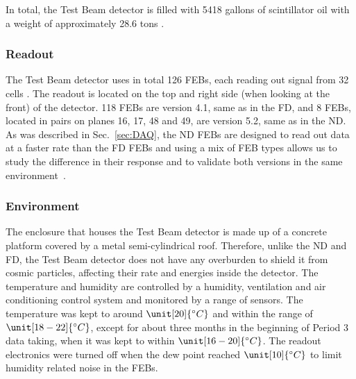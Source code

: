 
In total, the Test Beam detector is filled with 5418 gallons of scintillator oil with a weight of approximately 28.6 tons \cite{NOvA-doc-29543}.

\subsubsection*{Readout}
The Test Beam detector uses in total 126 \glspl{FEB}, each reading out signal from 32 cells \cite{NOvA-doc-29543}. The readout is located on the top and right side (when looking at the front) of the detector. 118 \glspl{FEB} are version 4.1, same as in the \gls{FD}, and 8 \glspl{FEB}, located in pairs on planes 16, 17, 48 and 49, are version 5.2, same as in the \gls{ND}. As was described in Sec.~\ref{sec:DAQ}, the \gls{ND} \glspl{FEB} are designed to read out data at a faster rate than the \gls{FD} \glspl{FEB} and using a mix of \gls{FEB} types allows us to study the difference in their response and to validate both versions in the same environment~\cite{LackeyThesisNOvATBProtons2022.pdf}.


\subsubsection*{Environment}
The enclosure that houses the Test Beam detector is made up of a concrete platform covered by a metal semi-cylindrical roof. Therefore, unlike the \gls{ND} and \gls{FD}, the Test Beam detector does not have any overburden to shield it from cosmic particles, affecting their rate and energies inside the detector. The temperature and humidity are controlled by a humidity, ventilation and air conditioning control system and monitored by a range of sensors. The temperature was kept to around $\unit[20]{^{\circ}C}$ and within the range of $\unit[18-22]{^{\circ}C}$, except for about three months in the beginning of Period 3 data taking, when it was kept to within $\unit[16-20]{^{\circ}C}$. The readout electronics were turned off when the dew point reached  $\unit[10]{^{\circ}C}$ to limit humidity related noise in the \glspl{FEB}.

